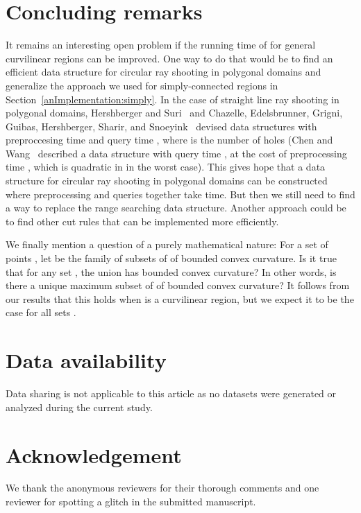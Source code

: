 \documentclass{article}
\begin{document}
\section{Concluding remarks}
It remains an interesting open problem if the running time of  for general curvilinear regions can be improved.
One way to do that would be to find an efficient data structure for circular ray shooting in polygonal domains and generalize the approach we used for simply-connected regions in Section~\ref{anImplementation:simply}.
In the case of straight line ray shooting in polygonal domains, Hershberger and Suri~\cite{hershberger95pedestrian} and Chazelle, Edelsbrunner, Grigni, Guibas, Hershberger, Sharir, and Snoeyink~\cite{chazelle94ray} devised data structures with preproccesing time  and query time , where  is the number of holes (Chen and Wang~\cite{chen2015visibility} described a data structure with query time , at the cost of preprocessing time , which is quadratic in  in the worst case).
This gives hope that a data structure for circular ray shooting in polygonal domains can be constructed where preprocessing and  queries together take  time.
But then we still need to find a way to replace the range searching data structure.
Another approach could be to find other cut rules that can be implemented more efficiently.

We finally mention a question of a purely mathematical nature:
For a set of points , let  be the family of subsets of  of bounded convex curvature.
Is it true that for any set , the union  has bounded convex curvature?
In other words, is there a unique maximum subset of  of bounded convex curvature?
It follows from our results that this holds when  is a curvilinear region, but we expect it to be the case for all sets .

\section{Data availability}

Data sharing is not applicable to this article as no datasets were generated or analyzed during the current study.

\section*{Acknowledgement}

We thank the anonymous reviewers for their thorough comments and one reviewer for spotting a glitch in the submitted manuscript.

{}
\end{document}
